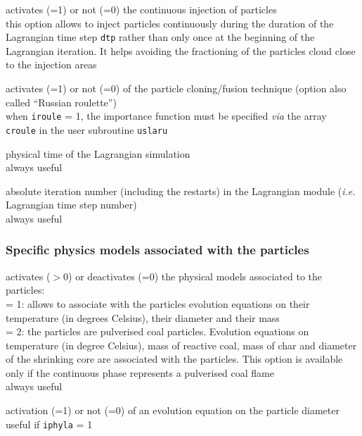 {activates (=1) or not (=0) the continuous injection of particles\\
this option allows to inject particles continuously during the duration of the
Lagrangian time step \texttt{dtp} rather than only once at the
beginning of the Lagrangian iteration. It helps avoiding the fractioning of
the particles cloud close to the injection areas}

{activates (=1) or not (=0) of the particle cloning/fusion technique
(option also called ``Russian roulette'')\\
when \texttt{iroule} = 1, the importance function must be specified {\em via} the
array \texttt{croule} in the user subroutine \texttt{uslaru}}

{physical time of the Lagrangian simulation \\
always useful}

{absolute iteration number (including the restarts) in the Lagrangian
module ({\em i.e.} Lagrangian time step number) \\
always useful}


\subsubsection{Specific physics models associated with the particles}

{activates ($>$0) or deactivates (=0) the physical models associated to the
particles:\\
\hspace*{1.3cm} = 1: allows to associate with the particles evolution
equations on their temperature (in degrees Celsius), their diameter and
their mass\\
\hspace*{1.3cm} = 2: the particles are pulverised coal particles.
Evolution equations on temperature (in degree Celsius), mass of
reactive coal, mass of char and diameter of the shrinking core are
associated with the particles. This option is available only if the
continuous phase represents a pulverised coal flame\\
always useful}

{activation (=1) or not (=0) of an evolution equation on the particle
diameter\\
useful if \texttt{iphyla} = 1}

